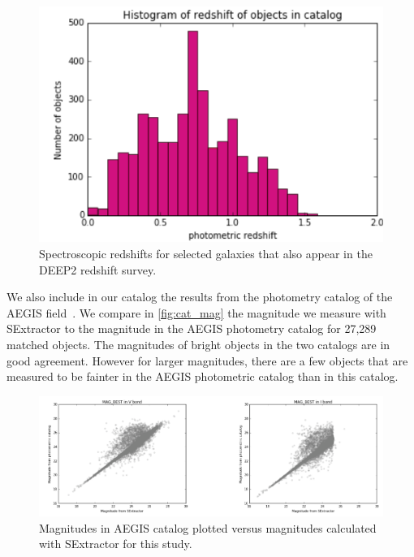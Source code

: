 \documentclass[a4paper,11pt]{article}
\begin{document}
\begin{figure}[h]
\centering\includegraphics[width=0.7\linewidth]{redshift.png}
\caption{Spectroscopic redshifts for selected galaxies that also appear in the DEEP2 redshift survey.}
\label{fig:redshift}
\end{figure}
We also include in our catalog the results from the photometry catalog of the AEGIS field~\citep{Lotz2008}. 
We compare in \autoref{fig:cat_mag} the magnitude we measure with SExtractor to the magnitude in the AEGIS photometry catalog for 27,289 matched objects. The magnitudes of bright objects in the two catalogs are in good agreement. However  for larger magnitudes, there are a few objects that are measured to be fainter in the AEGIS photometric catalog than in this catalog.
\begin{figure}[h]
\centering\includegraphics[width=1.\linewidth]{cat_mag.png}
\caption{Magnitudes in AEGIS catalog plotted versus magnitudes calculated with SExtractor for this study.}
\label{fig:cat_mag}
\end{figure}
\end{document}
